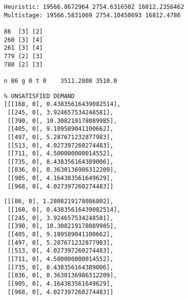 \documentclass[10pt]{article}
\theoremstyle{plain}
\theoremstyle{definition}
\theoremstyle{remark}
\begin{document}
\begin{enumerate}
\begin{minipage}[t]{5.5cm}
\tiny\begin{verbatim}
Heuristic: 19566.8672964 2754.6316502 16812.2356462
Multistage: 19566.5831069 2754.10450693 16812.4786

86	[3]	[2]
260	[3]	[4]
261	[3]	[4]
779	[2]	[3]
780	[2]	[3]

n 86 g 0 t 0	3511.2808 3510.0
\end{verbatim}
\end{minipage}
\begin{minipage}[t]{3.5cm}
\tiny\begin{verbatim}
% UNSATISFIED DEMAND
[[[168, 0], 0.43835616439082514],
 [[245, 0], 3.924657534248581],
 [[390, 0], 10.308219178089985],
 [[405, 0], 9.109589041100662],
 [[497, 0], 5.287671232877983],
 [[513, 0], 4.027397260274483],
 [[711, 0], 4.500000000014552],
 [[735, 0], 8.438356164389006],
 [[836, 0], 0.3630136986312209],
 [[905, 0], 4.164383561649629],
 [[968, 0], 4.027397260274483]]
\end{verbatim}
\end{minipage}
\begin{minipage}[t]{3.5cm}
\tiny\begin{verbatim}
[[[86, 0], 1.2808219178086802],
 [[168, 0], 0.43835616439082514],
 [[245, 0], 3.924657534248581],
 [[390, 0], 10.308219178089985],
 [[405, 0], 9.109589041100662],
 [[497, 0], 5.287671232877983],
 [[513, 0], 4.027397260274483],
 [[711, 0], 4.500000000014552],
 [[735, 0], 8.438356164389006],
 [[836, 0], 0.3630136986312209],
 [[905, 0], 4.164383561649629],
 [[968, 0], 4.027397260274483]]
 \end{verbatim}
\end{minipage}


\end{enumerate}
\end{document}
